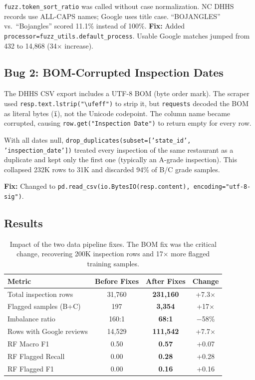 \documentclass{article}
\begin{document}
\texttt{fuzz.token\_sort\_ratio} was called without case normalization. NC DHHS records use ALL-CAPS names; Google uses title case. ``BOJANGLES'' vs.\ ``Bojangles'' scored 11.1\% instead of 100\%. \textbf{Fix:} Added \texttt{processor=fuzz\_utils.default\_process}. Usable Google matches jumped from 432 to 14,868 (34$\times$ increase).

\subsection{Bug 2: BOM-Corrupted Inspection Dates}

The DHHS CSV export includes a UTF-8 BOM (byte order mark). The scraper used \texttt{resp.text.lstrip("\textbackslash ufeff")} to strip it, but \texttt{requests} decoded the BOM as literal bytes (\texttt{\"i\guillemotright\guillemotleft}), not the Unicode codepoint. The column name became corrupted, causing \texttt{row.get("Inspection Date")} to return empty for every row.

With all dates null, \texttt{drop\_duplicates(subset=['state\_id', 'inspection\_date'])} treated every inspection of the same restaurant as a duplicate and kept only the first one (typically an A-grade inspection). This collapsed 232K rows to 31K and discarded 94\% of B/C grade samples.

\textbf{Fix:} Changed to \texttt{pd.read\_csv(io.BytesIO(resp.content), encoding="utf-8-sig")}.

\subsection{Results}

\begin{table}[h]
\centering
\caption{Impact of the two data pipeline fixes. The BOM fix was the critical change, recovering 200K inspection rows and 17$\times$ more flagged training samples.}
\label{tab:experiment}
\begin{tabular}{lccc}
\toprule
\textbf{Metric} & \textbf{Before Fixes} & \textbf{After Fixes} & \textbf{Change} \\
\midrule
Total inspection rows & 31,760 & \textbf{231,160} & +7.3$\times$ \\
Flagged samples (B+C) & 197 & \textbf{3,354} & +17$\times$ \\
Imbalance ratio & 160:1 & \textbf{68:1} & $-$58\% \\
Rows with Google reviews & 14,529 & \textbf{111,542} & +7.7$\times$ \\
RF Macro F1 & 0.50 & \textbf{0.57} & +0.07 \\
RF Flagged Recall & 0.00 & \textbf{0.28} & +0.28 \\
RF Flagged F1 & 0.00 & \textbf{0.16} & +0.16 \\
\bottomrule
\end{tabular}
\end{table}
\end{document}

